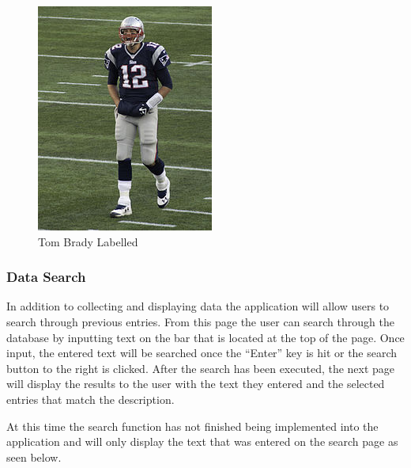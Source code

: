 \documentclass{scrreprt}
\begin{document}
\begin{figure}
  \includegraphics[width=\linewidth]{tbrady.jpg}
  \caption{Tom Brady Labelled}
  \label{fig:labelledBrady}
\end{figure}


\subsubsection{Data Search}

In addition to collecting and displaying data the application will allow users
to search through previous entries. From this page the user can search through
the database by inputting text on the bar that is located at the top of the
page. Once input, the entered text will be searched once the ``Enter'' key is hit
or the search button to the right is clicked. After the search has been
executed, the next page will display the results to the user with the text they
entered and the selected entries that match the description.

At this time the search function has not finished being implemented into the
application and will only display the text that was entered on the search page
as seen below.
\end{document}
